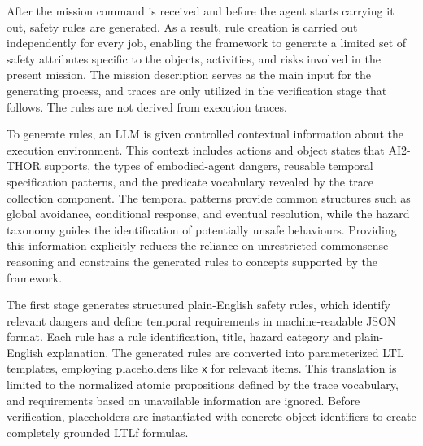 After the mission command is received and before the agent starts 
carrying it out, safety rules are generated. As a result, rule 
creation is carried out independently for every job, enabling the 
framework to generate a limited set of safety attributes specific 
to the objects, activities, and risks involved in the present 
mission. The mission description serves as the main input for the 
generating process, and traces are only utilized in the verification 
stage that follows. The rules are not derived from execution traces.

To generate rules, an LLM is given controlled contextual information
about the execution environment. This context includes actions and object 
states that AI2-THOR supports, the types of embodied-agent dangers, reusable 
temporal specification patterns, and the predicate vocabulary revealed by the 
trace collection component. The temporal patterns provide common structures 
such as global avoidance, conditional response, and eventual resolution, 
while the hazard taxonomy guides the identification of potentially unsafe 
behaviours. Providing this information explicitly reduces the reliance on 
unrestricted commonsense reasoning and constrains the generated rules to 
concepts supported by the framework.

The first stage generates structured plain-English safety rules, which 
identify relevant dangers and define temporal requirements in 
machine-readable JSON format. Each rule has a rule identification, 
title, hazard category and plain-English explanation. The generated 
rules are converted into parameterized LTL templates, employing 
placeholders like \texttt{x} for relevant items. This translation 
is limited to the normalized atomic propositions defined by the trace 
vocabulary, and requirements based on unavailable information are 
ignored. Before verification, placeholders are instantiated with 
concrete object identifiers to create completely grounded LTLf formulas.